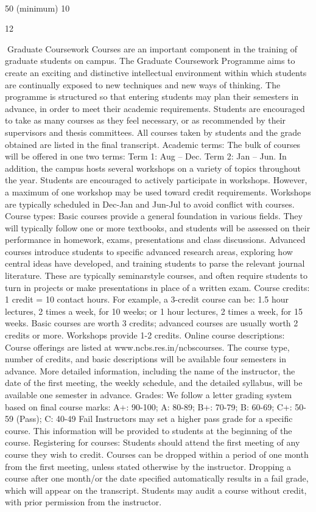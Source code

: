 \documentclass[a4paper,10pt]{article}
\begin{document}
	
  

50 (minimum)
10

12	
  

Graduate Coursework
Courses are an important component in the training of graduate students on campus. The
Graduate Coursework Programme aims to create an exciting and distinctive intellectual
environment within which students are continually exposed to new techniques and new
ways of thinking. The programme is structured so that entering students may plan their
semesters in advance, in order to meet their academic requirements. Students are encouraged
to take as many courses as they feel necessary, or as recommended by their supervisors and
thesis committees. All courses taken by students and the grade obtained are listed in the final
transcript.
Academic terms: The bulk of courses will be offered in one two terms: Term 1: Aug – Dec.
Term 2: Jan – Jun. In addition, the campus hosts several workshops on a variety of topics
throughout the year. Students are encouraged to actively participate in workshops. However,
a maximum of one workshop may be used toward credit requirements. Workshops are
typically scheduled in Dec-Jan and Jun-Jul to avoid conflict with courses.
Course types: Basic courses provide a general foundation in various fields. They will
typically follow one or more textbooks, and students will be assessed on their performance
in homework, exams, presentations and class discussions. Advanced courses introduce
students to specific advanced research areas, exploring how central ideas have developed,
and training students to parse the relevant journal literature. These are typically seminarstyle courses, and often require students to turn in projects or make presentations in place of
a written exam.
Course credits: 1 credit = 10 contact hours. For example, a 3-credit course can be: 1.5 hour
lectures, 2 times a week, for 10 weeks; or 1 hour lectures, 2 times a week, for 15 weeks.
Basic courses are worth 3 credits; advanced courses are usually worth 2 credits or more.
Workshops provide 1-2 credits.
Online course descriptions: Course offerings are listed at www.ncbs.res.in/ncbscourses.
The course type, number of credits, and basic descriptions will be available four semesters
in advance. More detailed information, including the name of the instructor, the date of the
first meeting, the weekly schedule, and the detailed syllabus, will be available one semester
in advance.
Grades: We follow a letter grading system based on final course marks:
A+: 90-100; A: 80-89; B+: 70-79; B: 60-69; C+: 50-59 (Pass); C: 40-49 Fail
Instructors may set a higher pass grade for a specific course. This information will be
provided to students at the beginning of the course.
Registering for courses: Students should attend the first meeting of any course they wish to
credit. Courses can be dropped within a period of one month from the first meeting, unless
stated otherwise by the instructor. Dropping a course after one month/or the date specified
automatically results in a fail grade, which will appear on the transcript. Students may audit
a course without credit, with prior permission from the instructor.
\end{document}
